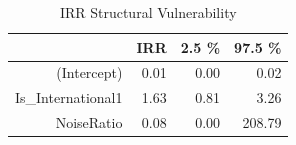 \begin{table}[ht]
\centering
\begin{tabular}{rrrr}
  \hline
 & IRR & 2.5 \% & 97.5 \% \\ 
  \hline
(Intercept) & 0.01 & 0.00 & 0.02 \\ 
  Is\_International1 & 1.63 & 0.81 & 3.26 \\ 
  NoiseRatio & 0.08 & 0.00 & 208.79 \\ 
   \hline
\end{tabular}
\caption{IRR Structural Vulnerability} 
\end{table}
